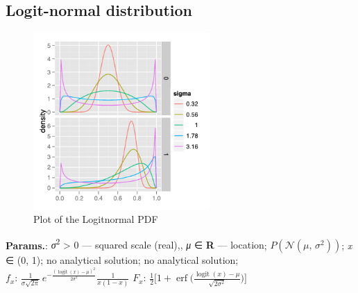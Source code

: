     
        
\subsection{Logit-normal distribution}


    \begin{figure}[H]
        \centering
        \includegraphics[width=0.6\textwidth]{images/LogitnormalPDF.png}
        \caption{Plot of the Logitnormal PDF}
    \end{figure}




    {\color{darkblue} \textbf{Params.}:} {\textit{σ}\textsuperscript{2} > 0 — squared scale (real),,  \textit{μ} ∈ \textbf{R} — location}; {$P( \mathcal{N}(\mu,\,\sigma^2) )$}; {\textit{x} ∈ (0, 1)}; {no analytical solution}; {no analytical solution};\hspace{0.5cm}\\{\color{darkblue} \textbf{$f_x$}:} {$\frac{1}{\sigma \sqrt{2 \pi}}\, e^{-\frac{(\operatorname{logit}(x) - \mu)^2}{2\sigma^2}}\frac{1}{x (1-x)}$}{\color{darkblue} \textbf{$F_x$}:} {$\frac12\Big[1 + \operatorname{erf}\Big( \frac{\operatorname{logit}(x)-\mu}{\sqrt{2\sigma^2}}\Big)\Big]$}



